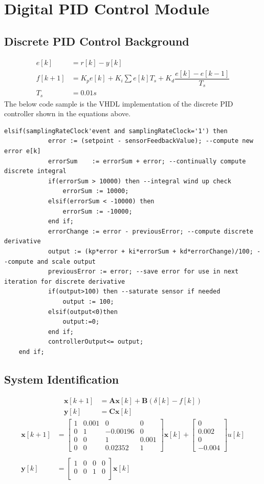 \documentclass{article}
\begin{document}
\section{Digital PID Control Module}
\subsection{Discrete PID Control Background}
\begin{align*}
e[k] &= r[k]-y[k]\\
f[k+1] &= K_pe[k]+K_i\sum e[k]T_s + K_d\dfrac{e[k]-e[k-1]}{T_s}\\
T_s&=0.01 s
\end{align*}
The below code sample is the VHDL implementation of the discrete PID controller shown in the equations above.
\begin{lstlisting}
elsif(samplingRateClock'event and samplingRateClock='1') then
			error := (setpoint - sensorFeedbackValue); --compute new error e[k]
			errorSum	:= errorSum + error; --continually compute discrete integral
			if(errorSum > 10000) then --integral wind up check
				errorSum := 10000;
			elsif(errorSum < -10000) then
				errorSum := -10000;
			end if;
			errorChange := error - previousError; --compute discrete derivative
			output := (kp*error + ki*errorSum + kd*errorChange)/100; --compute and scale output
			previousError := error; --save error for use in next iteration for discrete derivative
			if(output>100) then --saturate sensor if needed
				output := 100;
			elsif(output<0)then
				output:=0;
			end if;
			controllerOutput<= output;
	end if;
\end{lstlisting}
\subsection{System Identification}
 \begin{align*}
\boldsymbol{x}[k+1] &= \boldsymbol{A}\boldsymbol{x}[k] + \boldsymbol{B}(\delta[k]-f[k])\\
\boldsymbol{y}[k] &= \boldsymbol{C}\boldsymbol{x}[k]
\end{align*}
\begin{align*}
  \boldsymbol{x}[k+1] &= \begin{bmatrix}
	1 & 0.001 & 0 & 0\\
	0 & 1 & -0.00196 & 0\\
	0 & 0 & 1 &0.001 \\
	0 & 0 & 0.02352 & 1
\end{bmatrix}\boldsymbol{x}[k]+\begin{bmatrix} 0 \\ 0.002 \\ 0 \\ -0.004\end{bmatrix}u[k]\\\\
\boldsymbol{y}[k] &= \begin{bmatrix}
	1 & 0 & 0 & 0\\
	0 & 0 & 1 & 0\\
\end{bmatrix}\boldsymbol{x}[k]
\end{align*}
\end{document}
